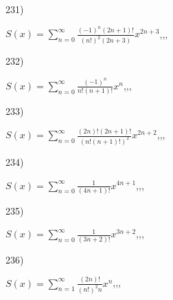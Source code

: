 \documentclass[11pt, ukrainian]{article}
\begin{document}
\par
\newpage
231) \space 
{%
{$S(x)=\sum\limits_{n=0}^{\infty}{\frac{{(-1)^n}(2n+1)!}{{(n!)^2}(2n+3)}}{x^{{2n+3}}}$},,, \par \smallskip  
}
\par
\vspace{0.9cm}
232) \space 
{%
{$S(x)=\sum\limits_{n=0}^{\infty}{\frac{(-1)^n}{n!(n+1)!}}{x^{{n}}}$},,, \par \smallskip  
}
\par
\vspace{0.9cm}
233) \space 
{%
{$S(x)=\sum\limits_{n=0}^{\infty}{\frac{(2n)!(2n+1)!}{(n!(n+1)!)^2}}{x^{{2n+2}}}$},,, \par \smallskip  
}
\par
\vspace{0.9cm}
234) \space 
{%
{$S(x)=\sum\limits_{n=0}^{\infty}{\frac{1}{(4n+1)!}}{x^{{4n+1}}}$},,, \par \smallskip  
}
\par
\vspace{0.9cm}
235) \space 
{%
{$S(x)=\sum\limits_{n=0}^{\infty}{\frac{1}{(3n+2)!}}{x^{{3n+2}}}$},,, \par \smallskip  
}
\par
\vspace{0.9cm}
236) \space 
{%
{$S(x)=\sum\limits_{n=1}^{\infty}{\frac{(2n)!}{{(n!)^2}n}}{x^{n}}$},,, \par \smallskip  
}
\end{document}
